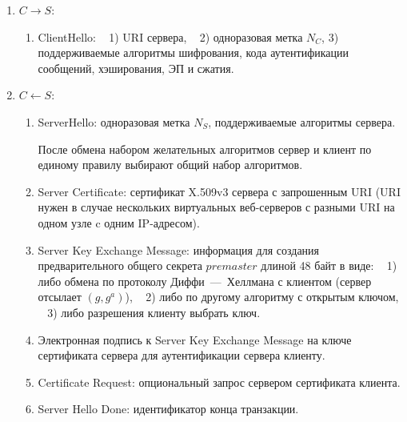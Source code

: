 \begin{enumerate}
    \item $C \rightarrow S$:
        \begin{enumerate}
            \item ClientHello: ~ 1) URI сервера, ~ 2) одноразовая метка $N_C$, 3) ~ поддерживаемые алгоритмы шифрования, кода аутентификации сообщений, хэширования, ЭП и сжатия.
        \end{enumerate}

    \item $C \leftarrow S$:
        \begin{enumerate}
            \item ServerHello: одноразовая метка $N_S$, поддерживаемые алгоритмы сервера.

            После обмена набором желательных алгоритмов сервер и клиент по единому правилу выбирают общий набор алгоритмов.
            \item Server Certificate: сертификат X.509v3 сервера с запрошенным URI (URI нужен в случае нескольких виртуальных веб-серверов с разными URI на одном узле c одним IP-адресом).
            \item Server Key Exchange Message: информация для создания предварительного общего секрета $premaster$ длиной 48 байт в виде: ~ 1) либо обмена по протоколу Диффи~---~Хеллмана с клиентом (сервер отсылает $(g, g^a)$), ~ 2) либо по другому алгоритму с открытым ключом, ~ 3) либо разрешения клиенту выбрать ключ.
            \item Электронная подпись к Server Key Exchange Message на ключе сертификата сервера для аутентификации сервера клиенту.
            \item Certificate Request: опциональный запрос сервером сертификата клиента.
            \item Server Hello Done: идентификатор конца транзакции.
        \end{enumerate}


\end{enumerate}
